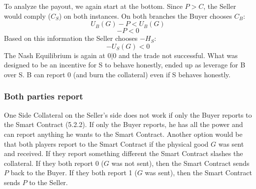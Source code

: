 \documentclass{cacthesis}
\begin{document}
To analyze the payout, we again start at the bottom. Since $P>C$, the Seller would comply ($C_S$) on both instances.\newline
On both branches the Buyer chooses $C_B$: \[U_B(G)-P < U_B(G)\] \[-P < 0\]
Based on this information the Seller chooses $-H_S$: \[-U_S(G) < 0\]
The Nash Equilibrium is again at $0|0$ and the trade not successful.\newline
What was designed to be an incentive for S to behave honestly, ended up as leverage for B over S. B can report 0 (and burn the collateral) even if S behaves honestly. 



\subsubsection{Both parties report}
One Side Collateral on the Seller's side does not work if only the Buyer reports to the Smart Contract (5.2.2). If only the Buyer reports, he has all the power and can report anything he wants to the Smart Contract.\newline
Another option would be that both players report to the Smart Contract if the physical good $G$ was sent and received.\newline 
If they report something different the Smart Contract slashes the collateral. If they both report 0 ($G$ was not sent), then the Smart Contract sends $P$ back to the Buyer. If they both report 1 ($G$ was sent), then the Smart Contract sends $P$ to the Seller.\newline
 
\end{document}
